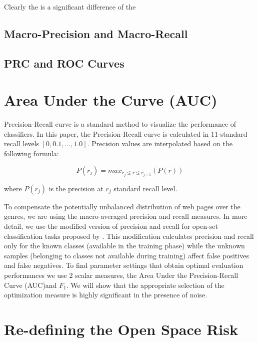 {Clearly the is a significant difference of the 


\subsection{Macro-Precision and Macro-Recall}\label{chap:eval_methods:sec:prf_macro}



\subsection{PRC and ROC Curves}\label{chap:eval_methods:sec:roc_prc}



\section{Area Under the Curve (AUC)}\label{chap:eval_methods:sec:closed_set_classification} 

Precision-Recall curve is a standard method to visualize the performance of classifiers. In this paper, the Precision-Recall curve is calculated in 11-standard recall levels $[0,0.1,...,1.0]$. Precision values are interpolated based on the following formula:

\begin{equation}
	P(r_j)=max_{r_j \leqslant r \leqslant r_{j+1}}(P(r))
\end{equation}

\noindent
where $P(r_j)$ is the precision at $r_j$ standard recall level.


To compensate the potentially unbalanced distribution of web pages over the genres, we are using the macro-averaged precision and recall measures. In more detail, we use the modified version of precision and recall for open-set classification tasks proposed by \parencite{mendesjunior2016}. This modification calculates precision and recall only for the known classes (available in the training phase) while the unknown samples (belonging to classes not available during training) affect false positives and false negatives. To find parameter settings that obtain optimal evaluation performances we use 2 scalar measures, the Area Under the Precision-Recall Curve (AUC)and $F_{1}$. We will show that the appropriate selection of the optimization measure is highly significant in the presence of noise.


\section{Re-defining the Open Space Risk}\label{chap:eval_methods:sec:open_space_risk} 

}
